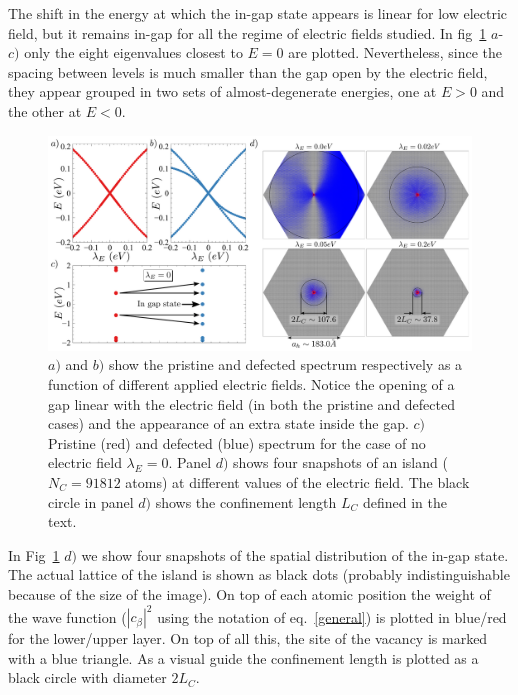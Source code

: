 The shift in the energy at which the in-gap state appears is linear for low electric field, but it remains in-gap for all the regime of electric fields studied. In fig~\ref{1vac_spec} $a$-$c)$ only the eight eigenvalues closest to $E=0$ are plotted. Nevertheless, since the spacing between levels is much smaller than the gap open by the electric field, they appear grouped in two sets of almost-degenerate energies, one at $E>0$ and the other at $E<0$.\\

\begin{figure}[!ht!]
\centering
\includegraphics[width=\textwidth]{chapter06/figures/single_vac_spectrum.pdf}
\vspace{-15pt}
\caption{$a)$ and $b)$ show the pristine and defected spectrum respectively as a function of different applied electric fields. Notice the opening of a gap linear with the electric field (in both the pristine and defected cases) and the appearance of an extra state inside the gap. $c)$ Pristine (red) and defected (blue) spectrum for the case of no electric field $\lambda_E=0$. Panel $d)$ shows four snapshots of an island ($N_C=91812$ atoms) at different values of the electric field. The black circle in panel $d)$ shows the confinement length $L_C$ defined in the text.}
\label{1vac_spec}
\end{figure}
\FloatBarrier

In Fig~\ref{1vac_spec} $d)$ we show four snapshots of the spatial distribution of the in-gap state. The actual lattice of the island is shown as black dots (probably indistinguishable because of the size of the image).
On top of each atomic position the weight of the wave function ($|c_\beta|^2$ using the notation of eq.~\eqref{general}) is plotted in blue/red for the lower/upper layer.
On top of all this, the site of the vacancy is marked with a blue triangle.
As a visual guide the confinement length is plotted as a black circle with diameter $2L_C$.\\

